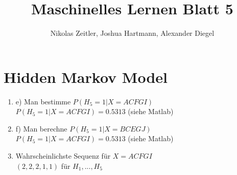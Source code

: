 \documentclass[a4paper]{scrartcl}
\author{Nikolas Zeitler, Joshua Hartmann, Alexander Diegel}
\title{Maschinelles Lernen Blatt 5}
\begin{document}
\maketitle
\section{Hidden Markov Model}
\begin{enumerate}
	\item e) Man bestimme $P(H_5=1|X=ACFGI)$\\
	$P(H_5=1|X=ACFGI) = 0.5313$ (siehe Matlab)
	\item f) Man berechne $P(H_5=1|X=BCEGJ)$\\
	$P(H_5=1|X=ACFGI) = 0.5313$ (siehe Matlab)
	\item Wahrscheinlichste Sequenz für $X=ACFGI$\\
	\rightarrow $(2,2,2,1,1)$ für $H_1,...,H_5$
\end{enumerate}
\end{document}
